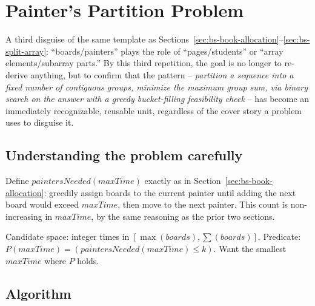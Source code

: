 \section{Painter's Partition Problem}
\label{sec:bs-painters-partition}


\begin{patternbox}
A third disguise of the same template as
Sections~\ref{sec:bs-book-allocation}--\ref{sec:bs-split-array}:
``boards/painters'' plays the role of ``pages/students'' or
``array elements/subarray parts.'' By this third repetition, the goal is
no longer to re-derive anything, but to confirm that the pattern --
\emph{partition a sequence into a fixed number of contiguous groups,
minimize the maximum group sum, via binary search on the answer with a
greedy bucket-filling feasibility check} -- has become an immediately
recognizable, reusable unit, regardless of the cover story a problem uses
to disguise it.
\end{patternbox}

\subsection*{Understanding the problem carefully}

Define $\textit{paintersNeeded}(\textit{maxTime})$ exactly as in
Section~\ref{sec:bs-book-allocation}: greedily assign boards to the
current painter until adding the next board would exceed
$\textit{maxTime}$, then move to the next painter. This count is
non-increasing in $\textit{maxTime}$, by the same reasoning as the prior
two sections.

\begin{ideabox}
Candidate space: integer times in $[\max(\textit{boards}),
\sum(\textit{boards})]$. Predicate:
$P(\textit{maxTime}) = (\textit{paintersNeeded}(\textit{maxTime}) \le k)$.
Want the smallest $\textit{maxTime}$ where $P$ holds.
\end{ideabox}

\subsection*{Algorithm}

